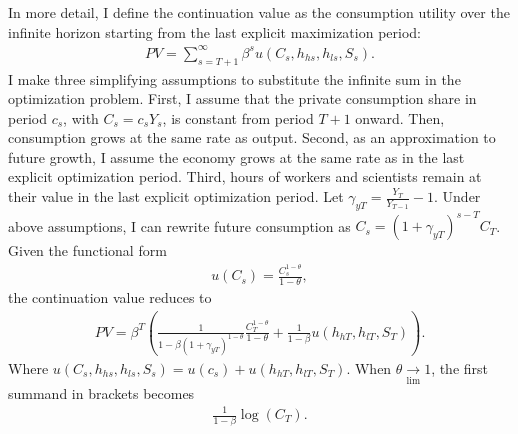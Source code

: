 In more detail, I define the continuation value as the consumption utility over the infinite horizon starting from the last explicit maximization period:
\begin{align*}
PV=\sum_{s=T+1}^{\infty} \beta^{s}u(C_s, h_{hs}, h_{ls}, S_{s}).
\end{align*}
I make three simplifying assumptions to substitute the infinite sum in the optimization problem. First, 
I assume that the private consumption share in period $c_s$, with $C_s=c_sY_s$, is constant from period $T+1$ onward.  Then, consumption grows at the same rate as output. 
Second, as an approximation to future growth, I assume the economy grows at the same rate as in the last explicit optimization period. Third, hours of workers and scientists remain at their value in the last explicit optimization period. %
Let $\gamma_{yT}=\frac{Y_{T}}{Y_{T-1}}-1$. Under above assumptions, I can rewrite future consumption as $C_s=(1+\gamma_{yT})^{s-T}C_{T}$.
Given the functional form
\begin{align*}
u(C_s)= \frac{C_s^{1-\theta}}{1-\theta},
\end{align*}
the continuation value reduces to
\begin{align*}
PV= \beta^{T}\left(\frac{1}{1-\beta (1+\gamma_{yT})^{1-\theta}}\frac{C_{T}^{1-\theta}}{1-\theta}+ \frac{1}{1-\beta}u(h_{hT}, h_{lT}, S_T)\right).
\end{align*}
Where $u(C_s, h_{hs}, h_{ls}, S_{s})=u(c_s)+u(h_{hT}, h_{lT}, S_T)$.
When $\theta\underset{\lim}{\rightarrow} 1$,  the first summand in brackets becomes
\begin{align*}
\frac{1}{1-\beta}\log(C_{T}).
\end{align*}

%

